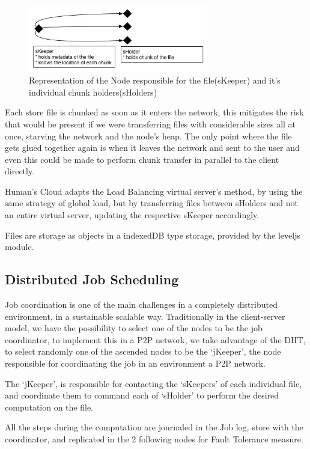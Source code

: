 \begin{figure}[h!]
  \centering
  \includegraphics[width=0.7\textwidth]{img/skeepersholder.jpg}
  \caption{Representation of the Node responsible for the file(sKeeper) and it's individual chunk holders(sHolders)}
  \label{fig:skeepersholder}
\end{figure}

Each store file is chunked as soon as it enters the network, this mitigates the risk that would be present if we were transferring files with considerable sizes all at once, starving the network and the node's heap. The only point where the file gets glued together again is when it leaves the network and sent to the user and even this could be made to perform chunk transfer in parallel to the client directly.

Human's Cloud adapts the Load Balancing virtual server's method, by using the same strategy of global load, but by transferring files between sHolders and not an entire virtual server, updating the respective sKeeper accordingly. 

Files are storage as objects in a indexedDB type storage, provided by the leveljs module. 

\subsection{Distributed Job Scheduling}

Job coordination is one of the main challenges in a completely distributed environment, in a sustainable scalable way. Traditionally in the client-server model, we have the possibility to select one of the nodes to be the job coordinator, to implement this in a P2P network, we take advantage of the DHT, to select randomly one of the ascended nodes to be the `jKeeper', the node responsible for coordinating the job in an environment a P2P network.

The `jKeeper', is responsible for contacting the `sKeepers' of each individual file, and coordinate them to command each of `sHolder' to perform the desired computation on the file.

All the steps during the computation are journaled in the Job log, store with the coordinator, and replicated in the 2 following nodes for Fault Tolerance measure.


